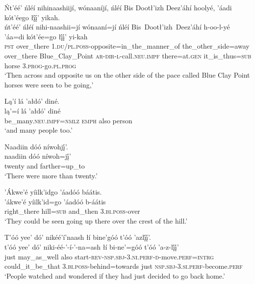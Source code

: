 \ea\label{ex:text1-61-2}
Ńt’éé’ ńléí nihinaashiijí, wónaaníjí, ńléí Bis Dootł’izh Deez’áhí hoolyé, ’áadi kót’éego łį́į́’ yikah.\\
\gll ńt’éé’	ńléí	nihi-naashii=jí	wónaaní=jí	ńléí	Bis~Dootł’izh~{Deez’áhí}	h-oo-l-yé	’áa=di	kót’ée=go	łį́į́’	yi-kah\\
     \textsc{pst}	over\_there	1.\textsc{du}/\textsc{pl}.\textsc{poss}-opposite=in\_the\_manner\_of	the\_other\_side=away	over\_there	Blue\_Clay\_Point	\textsc{ar}-\textsc{dir}-\textsc{l}-call.\textsc{neu}.\textsc{impf}	there=at.\textsc{gen}	it\_is\_thus=\textsc{sub}	horse	3.\textsc{prog}-go.\textsc{pl}.\textsc{prog}\\
\glt `Then across and opposite us on the other side of the pace called Blue Clay Point horses were seen to be going,'
\z

\ea\label{ex:text1-61-3}
Lą’í lá ’ałdó’ diné.\\
\gll lą’=í	lá	’ałdó’	diné\\
     be\_many.\textsc{neu}.\textsc{impf}=\textsc{nmlz}	\textsc{emph}	also	person\\
\glt `and many people too.'
\z

\ea\label{ex:text1-61-4}
Naadiin dóó níwohjį́’.\\
\gll naadiin	dóó	níwoh=jį́’\\
     twenty	and	farther=up\_to\\
\glt `There were more than twenty.'
\z

\ea\label{ex:text1-61-5}
’Ákwe’é yíilk’idgo ’áadóó báátis.\\
\gll ’ákwe’é	yíilk’id=go	’áadóó	b-áátis\\
     right\_there	hill=\textsc{sub}	and\_then	3.\textsc{bi}.\textsc{poss}-over\\
\glt `They could be seen going up there over the crest of the hill.'
\z

\ea\label{ex:text1-61-6}
T’óó yee’ dó’ nikéé’í’naash łí bine’góó t’óó ’azlį́į́’.\\
\gll t’óó	yee’	dó’	niki-éé-’-í-’-na=ash	łí	bi-ne’=góó	t’óó	’a-z-lį́į́’\\
     just	may\_as\_well	also	start-\textsc{rev}-\textsc{nsp}.\textsc{sbj}-3.\textsc{ni}.\textsc{perf}-\textsc{d}-move.\textsc{perf}=\textsc{intrg}	could\_it\_be\_that	3.\textsc{bi}.\textsc{poss}-behind=towards	just	\textsc{nsp}.\textsc{sbj}-3.\textsc{si}.\textsc{perf}-become.\textsc{perf}\\
\glt `People watched and wondered if they had just decided to go back home.'
\z

